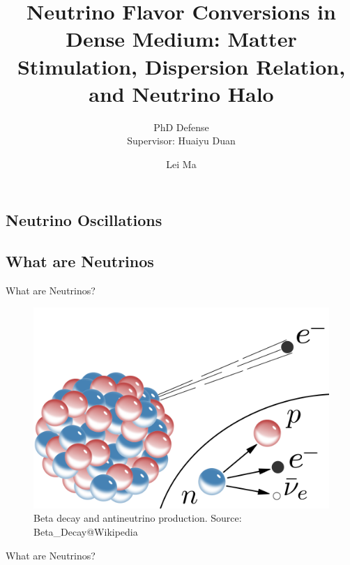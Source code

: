 \documentclass[9pt]{beamer}
\title{Neutrino Flavor Conversions in Dense Medium: Matter Stimulation, Dispersion Relation, and Neutrino Halo} %
\subtitle{PhD Defense\\ Supervisor: Huaiyu Duan} %
\author{Lei Ma}
\begin{document}
  \frame{\maketitle}


  \begin{darkframes}


    \section{Neutrino Oscillations}

    \subsection{What are Neutrinos}

    \begin{frame}{What are Neutrinos?}

    \begin{figure}
    \includegraphics[width=0.9\linewidth,height=0.9\textheight,keepaspectratio]{assets/beta-decay.png}
    \caption*{Beta decay and antineutrino production. Source: Beta\_Decay@Wikipedia}
    \end{figure}


    \end{frame}

    \begin{frame}{What are Neutrinos?}


\end{frame}
\end{darkframes}
\end{document}
